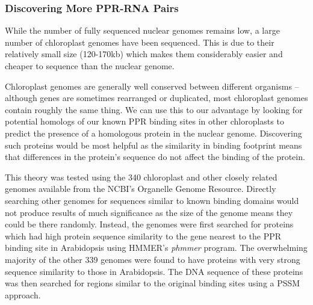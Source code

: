 \subsubsection{Discovering More PPR-RNA Pairs}

While the number of fully sequenced nuclear genomes remains low, a large 
number of chloroplast genomes have been sequenced.
This is due to their relatively small size (120-170kb) which makes them
considerably easier and cheaper to sequence than the nuclear genome.

Chloroplast genomes are generally well conserved between different organisms --
although genes are sometimes rearranged or duplicated, most chloroplast genomes
contain roughly the same thing.
We can use this to our advantage by looking for potential homologs of our known
PPR binding sites in other chloroplasts to predict the presence of a homologous
protein in the nuclear genome.
Discovering such proteins would be most helpful as the similarity in binding
footprint means that differences in the protein's sequence do not affect the
binding of the protein.

This theory was tested using the 340 chloroplast and other closely related
genomes available from the NCBI's Organelle Genome Resource.
Directly searching other genomes for sequences similar to known binding domains
would not produce results of much significance as the size of the genome means
they could be there randomly.
Instead, the genomes were first searched for proteins which had high protein
sequence similarity to the gene nearest to the PPR binding site in Arabidopsis
using HMMER's \emph{phmmer} program.
The overwhelming majority of the other 339 genomes were found to have proteins 
with very strong sequence similarity to those in Arabidopsis. 
The DNA sequence of these proteins was then searched for regions similar to the
original binding sites using a PSSM approach.


